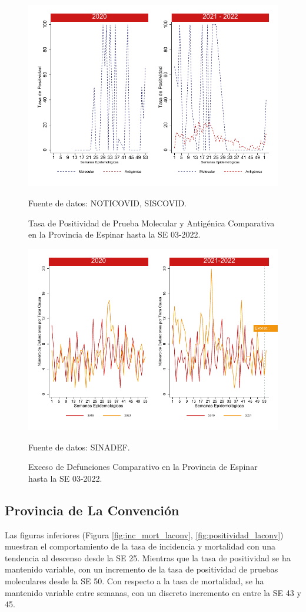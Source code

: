 \documentclass[12pt,a4paper,openany]{book}
\begin{document}
		\begin{figure}[h]
			\caption{Tasa de Positividad de Prueba Molecular y Antigénica Comparativa en la Provincia de Espinar hasta la SE 03-2022.}\label{fig:positividad_espinar}
			\begin{center}
				\includegraphics[width=0.7\linewidth]{../figuras/positividad_20_21_8}
			\end{center}
			{\footnotesize {Fuente de datos: NOTICOVID, SISCOVID.}}
		\end{figure}
		
		\begin{figure}[h]
			\caption{Exceso de Defunciones Comparativo en la Provincia de Espinar hasta la SE 03-2022.}\label{fig:exceso_espinar}
			\begin{center}
				\includegraphics[width=0.7\linewidth]{../figuras/exceso_8}
			\end{center}
			{\footnotesize {Fuente de datos: SINADEF.}}
		\end{figure}
		
		\clearpage
		
		\subsection*{Provincia de La Convención}
		\noindent Las figuras inferiores (Figura \ref{fig:inc_mort_laconv}, \ref{fig:positividad_laconv}) muestran el comportamiento de la tasa de incidencia y mortalidad con una tendencia al descenso desde la SE 25. Mientras que la tasa de positividad se ha mantenido variable, con un incremento de la tasa de positividad de pruebas moleculares desde la SE 50.
		Con respecto a la tasa de mortalidad, se ha mantenido variable entre semanas, con un discreto incremento en entre la SE 43 y 45. 
		
\end{document}
